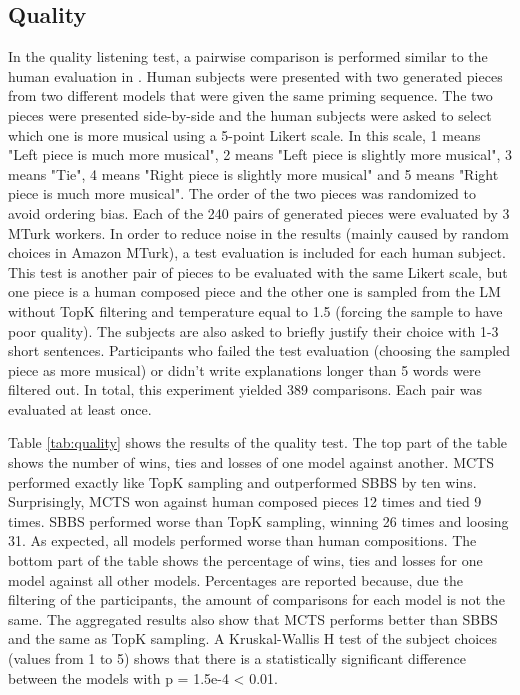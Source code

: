 \subsection{Quality}

In the quality listening test, a pairwise comparison is performed similar to the human evaluation in \cite{huang2018music}. Human subjects were presented with two generated pieces from two different models that were given the same priming sequence. The two pieces were presented side-by-side and the human subjects were asked to select which one is more musical using a 5-point Likert scale. In this scale, 1 means "Left piece is much more musical", 2 means "Left piece is slightly more musical", 3 means "Tie", 4 means "Right piece is slightly more musical" and 5 means "Right piece is much more musical". The order of the two pieces was randomized to avoid ordering bias. Each of the 240 pairs of generated pieces were evaluated by 3 MTurk workers. In order to reduce noise in the results (mainly caused by random choices in Amazon MTurk), a test evaluation is included for each human subject. This test is another pair of pieces to be evaluated with the same Likert scale, but one piece is a human composed piece and the other one is sampled from the LM without TopK filtering and temperature equal to 1.5 (forcing the sample to have poor quality). The subjects are also asked to briefly justify their choice with 1-3 short sentences. Participants who failed the test evaluation (choosing the sampled piece as more musical) or didn't write explanations longer than 5 words were filtered out. In total, this experiment yielded 389 comparisons. Each pair was evaluated at least once.

Table \ref{tab:quality} shows the results of the quality test. The top part of the table shows the number of wins, ties and losses of one model against another.  MCTS performed exactly like TopK sampling and outperformed SBBS by ten wins. Surprisingly, MCTS won against human composed pieces 12 times and tied 9 times. SBBS performed worse than TopK sampling, winning 26 times and loosing 31. As expected, all models performed worse than human compositions. The bottom part of the table shows the percentage of wins, ties and losses for one model against all other models. Percentages are reported because, due the filtering of the participants, the amount of comparisons for each model is not the same. The aggregated results also show that MCTS performs better than SBBS and the same as TopK sampling. A Kruskal-Wallis H test of the subject choices (values from 1 to 5) shows that there is a statistically significant difference between the models with p = 1.5e-4 < 0.01.

